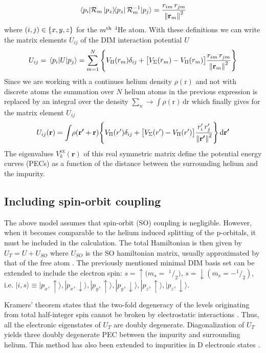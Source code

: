 \documentclass[12pt,a4paper,twosides]{book}
\renewcommand{\vec}[1]{\bm{\mathrm{#1}}}
\newcommand{\diff}[1]{\,\mathrm{d}{\vec{#1}}}
\begin{document}
			\begin{equation}
				\mel{p_i}{\mathcal{R}_m\dyad{p_z}\mathcal{R}_m^{-1}}{p_j} = \frac{r_{im}\,r_{jm}}{\norm{\vec{r}_m}^2}		\label{eq39}
			\end{equation}	
			where $(i,j)\in\qty{x,y,z}$ for the $m^{\rm th}$ $^4$He atom. With these definitions we can write the matrix elements $U_{ij}$ of the DIM interaction potential $U$
			\begin{align}
				U_{ij}=\mel{p_i}{U}{p_j} = \sum_{m=1}^{N}\qty{V_\Pi(r_m)\delta_{ij}+\qty\big[V_\Sigma(r_m)-V_\Pi(r_m)]\frac{r_{im}\,r_{jm}}{\norm{\vec{r}_m}^2}}  \label{eq40}
			\end{align}
			Since we are working with a continues helium density $\rho(\vec{r})$ and not with discrete atoms the summation over $N$ helium atoms in the previous expression is replaced by an integral over the density $\sum_n\rightarrow\int\!\rho(\vec{r})\diff{r}$ which finally gives for the matrix element $U_{ij}$
			\begin{align}
				U_{ij}(\vec{r}) = \int\! \rho\qty(\vec{r'}+\vec{r})\qty{V_\Pi(r')\delta_{ij}+\qty\big[V_\Sigma(r')-V_\Pi(r')]\frac{r'_i\,r'_j}{\norm{\vec{r'}}^2}}\diff{r'} 	\label{eq41}
			\end{align}
			The eigenvalues $V^{\mathrm{ex}}_k(\mathbf{r})$ of this real symmetric matrix define the potential energy curves (PECs) as a function of the distance between the surrounding helium and the impurity.
		
		\subsection{Including spin-orbit coupling}
			The above model assumes that spin-orbit (SO) coupling is negligible. 
			However, when it becomes comparable to the helium induced splitting of the p-orbitals, it must be included in the calculation. 
			The total Hamiltonian is then given by $U_T = U+U_{SO}$ where $U_{SO}$ is the SO hamiltonian matrix, usually approximated by that of the free atom \cite{Jak97}.
			The previously mentioned minimal DIM basis set can be extended to include the electron spin: $s = \uparrow (m_s = $ $^1\!/_2)$, $s= \downarrow (m_s= -^1\!/_2)$, i.e. 
			$|i,s \rangle \equiv |p_x, \uparrow \rangle, |p_x, \downarrow \rangle, |p_y, \uparrow \rangle, |p_y, \downarrow \rangle, |p_z, \uparrow \rangle, |p_z, \downarrow \rangle$.
			
			Kramers' theorem states that the two-fold degeneracy of the levels originating from total half-integer spin cannot be broken by electrostatic interactions \cite{Nak01}. 
			Thus, all the electronic eigenstates of $U_T$ are doubly degenerate. 
			Diagonalization of $U_T$ yields three doubly degenerate PEC between the impurity and surrounding helium. 
			This method has also been extended to impurities in D electronic states \cite{Lea16,Mel14}.
			
\end{document}
